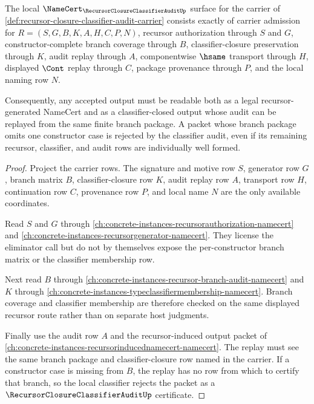 \begin{theorem}
\label{thm:recursor-closure-classifier-audit-namecert-obligations}
The local $\NameCert_{\RecursorClosureClassifierAuditUp}$ surface for the carrier of \autoref{def:recursor-closure-classifier-audit-carrier} consists exactly of carrier admission for $R=(S,G,B,K,A,H,C,P,N)$, recursor authorization through $S$ and $G$, constructor-complete branch coverage through $B$, classifier-closure preservation through $K$, audit replay through $A$, componentwise $\hsame$ transport through $H$, displayed $\Cont$ replay through $C$, package provenance through $P$, and the local naming row $N$.

Consequently, any accepted output must be readable both as a legal recursor-generated NameCert and as a classifier-closed output whose audit can be replayed from the same finite branch package. A packet whose branch package omits one constructor case is rejected by the classifier audit, even if its remaining recursor, classifier, and audit rows are individually well formed.
\end{theorem}
\begin{proof}
Project the carrier rows. The signature and motive row $S$, generator row $G$, branch matrix $B$, classifier-closure row $K$, audit replay row $A$, transport row $H$, continuation row $C$, provenance row $P$, and local name $N$ are the only available coordinates.

Read $S$ and $G$ through \autoref{ch:concrete-instances-recursorauthorization-namecert} and \autoref{ch:concrete-instances-recursorgenerator-namecert}. They license the eliminator call but do not by themselves expose the per-constructor branch matrix or the classifier membership row.

Next read $B$ through \autoref{ch:concrete-instances-recursor-branch-audit-namecert} and $K$ through \autoref{ch:concrete-instances-typeclassifiermembership-namecert}. Branch coverage and classifier membership are therefore checked on the same displayed recursor route rather than on separate host judgments.

Finally use the audit row $A$ and the recursor-induced output packet of \autoref{ch:concrete-instances-recursorinducednamecert-namecert}. The replay must see the same branch package and classifier-closure row named in the carrier. If a constructor case is missing from $B$, the replay has no row from which to certify that branch, so the local classifier rejects the packet as a $\RecursorClosureClassifierAuditUp$ certificate.
\end{proof}

